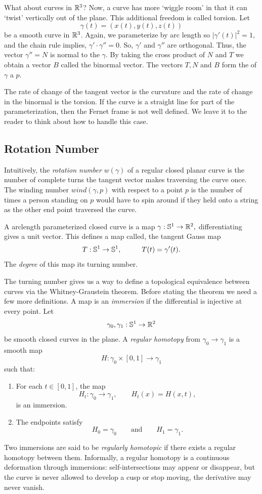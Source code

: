 What about curves in $\mathbb{R}^3$? Now, a curve has more `wiggle room' in that it
 can `twist' vertically out of the plane.
This additional freedom is called torsion.
Let $$\gamma(t)=(x(t),y(t),z(t))$$ be a smooth curve in $\mathbb{R}^3$.
Again, we parameterize by arc length so $|\gamma'(t)|^2=1,$ and the chain rule implies, $\gamma'\cdot \gamma''=0$.
So, $\gamma'$ and $\gamma''$ are orthogonal.
Thus, the
vector $\gamma''=N$ is normal to the $\gamma$. 
By taking the cross product of $N$ and $T$ we obtain a vector $B$ called
the binormal vector.
The vectors $T,N$ and $B$ form the  of $\gamma$ a $p.$


The rate of change of the tangent vector is the curvature and the rate of change in
the binormal is the torsion. If the curve is a straight line for part of the parameterization,
then the Fernet frame is not well defined. We leave it to the reader to think about how to handle
this case.

\subsection{Rotation Number}


Intuitively, the \emph{rotation number} $w(\gamma)$ of a regular closed planar curve is the number
of complete turns the tangent vector makes traversing the curve once.
The winding number $wind(\gamma,p)$ with respect to a point $p$ is the number of times a person standing on $p$ would have to spin around if they held onto a string as the other end point traversed the curve.


A arclength parameterized closed curve is a map $\gamma:\mathbb{S}^1\rightarrow \mathbb{R}^2,$ differentiating
gives a unit vector. This defines a map called, the tangent Gauss map
$$T:\mathbb{S}^1\rightarrow \mathbb{S}^1,\hspace{1cm} T(t)=\gamma'(t).$$
The \emph{degree} of this map its turning number.



The turning number gives us a way to define a topological equivalence between curves via the Whitney-Graustein theorem. Before stating the theorem we need a few more definitions.
A map is an \emph{immersion} if the differential is injective at every point.
Let
\[
\gamma_0, \gamma_1 : \mathbb{S}^1 \to \mathbb{R}^2
\]
be smooth closed curves in the plane.
A \emph{regular homotopy} from $\gamma_0\rightarrow \gamma_1$ is a smooth map
\[
H : \gamma_0 \times [0,1] \to \gamma_1
\]
such that:
\begin{enumerate}
    \item For each \(t \in [0,1]\), the map
    \[
    H_t :  \gamma_0 \to  \gamma_1,
    \qquad
    H_t(x)=H(x,t),
    \]
    is an immersion.

    \item The endpoints satisfy
    \[
    H_0=\gamma_0
    \qquad\text{and}\qquad
    H_1=\gamma_1.
    \]
\end{enumerate}
Two immersions are said to be \emph{regularly homotopic} if there exists a
regular homotopy between them. Informally, a regular homotopy is a continuous deformation through immersions: self-intersections may appear or disappear, but the curve is never allowed to develop a cusp or stop moving, the derivative may never vanish.

